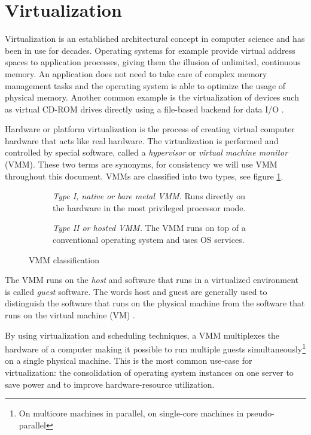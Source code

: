 \section{Virtualization}
Virtualization is an established architectural concept in computer science and
has been in use for decades. Operating systems for example provide virtual
address spaces to application processes, giving them the illusion of unlimited,
continuous memory. An application does not need to take care of complex memory
management tasks and the operating system is able to optimize the usage of
physical memory. Another common example is the virtualization of devices such
as virtual CD-ROM drives directly using a file-based backend for data I/O
\cite{CryptoCloud}.

Hardware or platform virtualization is the process of creating virtual computer
hardware that acts like real hardware. The virtualization is performed and
controlled by special software, called a \emph{hypervisor} or
\emph{virtual machine monitor} (VMM). These two terms are synonyms,
for consistency we will use VMM throughout this document. VMMs are classified
into two types, see figure \ref{fig:vmm-classification}.

\begin{figure}
	\centering
	\begin{subfigure}[b]{0.24\textwidth}
		\centering
		
		\caption{\emph{Type I, native or bare metal VMM.} Runs directly on the
		hardware in the most privileged processor mode.}
	\end{subfigure}
	\qquad
	\begin{subfigure}[b]{0.24\textwidth}
		\centering
		
		\caption{\emph{Type II or hosted VMM.} The VMM runs on top of a
		conventional operating system and uses OS services.}
	\end{subfigure}
	\caption{VMM classification}
	\label{fig:vmm-classification}
\end{figure}

The VMM runs on the \emph{host} and software that runs in a virtualized
environment is called \emph{guest} software. The words host and guest are
generally used to distinguish the software that runs on the physical machine
from the software that runs on the virtual machine (VM)
\cite{wiki:virtualization}.

By using virtualization and scheduling techniques, a VMM multiplexes the
hardware of a computer making it possible to run multiple guests
simultaneously\footnote{On multicore machines in parallel, on single-core
machines in pseudo-parallel} on a single physical machine. This is the most
common use-case for virtualization: the consolidation of operating system
instances on one server to save power and to improve hardware-resource
utilization.


